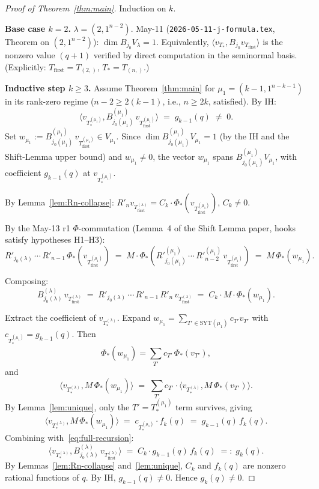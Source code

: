 \documentclass[11pt]{article}
\theoremstyle{definition}
\begin{document}
\begin{proof}[Proof of Theorem~\ref{thm:main}]
Induction on $k$.

\textbf{Base case $k = 2$.}  $\lambda = (2, 1^{n-2})$.  May-11
(\texttt{2026-05-11-j-formula.tex}, Theorem on $(2, 1^{n-2})$):
$\dim B_{j_0} V_\lambda = 1$.  Equivalently,
$\langle v_{T_{*}}, B_{j_0} v_{T_{\mathrm{first}}}\rangle$ is the
nonzero value $(q+1)$ verified by direct computation in the seminormal
basis.  (Explicitly: $T_{\mathrm{first}} = T_{(2,)}$, $T_{*} = T_{(n,)}$.)

\textbf{Inductive step $k \ge 3$.}  Assume Theorem~\ref{thm:main} for
$\mu_1 = (k{-}1, 1^{n-k-1})$ in its rank-zero regime ($n{-}2 \ge 2(k{-}1)$,
i.e., $n \ge 2k$, satisfied).  By IH:
\[
    \langle v_{T_{*}^{(\mu_1)}}, B^{(\mu_1)}_{j_0(\mu_1)}\,v_{T_{\mathrm{first}}^{(\mu_1)}}\rangle
    \;=\; g_{k-1}(q) \;\ne\; 0.
\]
Set $w_{\mu_1} := B^{(\mu_1)}_{j_0(\mu_1)}\,v_{T_{\mathrm{first}}^{(\mu_1)}}
\in V_{\mu_1}$.  Since $\dim B^{(\mu_1)}_{j_0(\mu_1)} V_{\mu_1} = 1$ (by
the IH and the Shift-Lemma upper bound) and $w_{\mu_1} \ne 0$, the
vector $w_{\mu_1}$ spans $B^{(\mu_1)}_{j_0(\mu_1)} V_{\mu_1}$, with
coefficient $g_{k-1}(q)$ at $v_{T_{*}^{(\mu_1)}}$.

By Lemma~\ref{lem:Rn-collapse}:
$R'_n v_{T_{\mathrm{first}}^{(\lambda)}} = C_k \cdot \Phi_*(v_{T_{\mathrm{first}}^{(\mu_1)}})$,
$C_k \ne 0$.

By the May-13 r1 $\Phi$-commutation (Lemma~4 of the Shift Lemma paper,
hooks satisfy hypotheses H1--H3):
\[
    R'_{j_0(\lambda)}\,\cdots\,R'_{n-1}\,\Phi_*(v_{T_{\mathrm{first}}^{(\mu_1)}})
    \;=\;
    M \cdot \Phi_*\!\left(R'^{(\mu_1)}_{j_0(\mu_1)}\,\cdots\,R'^{(\mu_1)}_{n-2}\,
    v_{T_{\mathrm{first}}^{(\mu_1)}}\right)
    \;=\; M\,\Phi_*(w_{\mu_1}).
\]

Composing:
\begin{equation}\label{eq:full-recursion}
    B^{(\lambda)}_{j_0(\lambda)}\,v_{T_{\mathrm{first}}^{(\lambda)}}
    \;=\;
    R'_{j_0(\lambda)}\,\cdots\,R'_{n-1}\,R'_n\,v_{T_{\mathrm{first}}^{(\lambda)}}
    \;=\;
    C_k \cdot M \cdot \Phi_*(w_{\mu_1}).
\end{equation}

Extract the coefficient of $v_{T_{*}^{(\lambda)}}$.  Expand
$w_{\mu_1} = \sum_{T' \in \mathrm{SYT}(\mu_1)} c_{T'} v_{T'}$ with
$c_{T_{*}^{(\mu_1)}} = g_{k-1}(q)$.  Then
\[
    \Phi_*(w_{\mu_1}) = \sum_{T'} c_{T'}\,\Phi_*(v_{T'}),
\]
and
\[
    \langle v_{T_{*}^{(\lambda)}}, M\,\Phi_*(w_{\mu_1})\rangle
    \;=\;
    \sum_{T'} c_{T'} \cdot \langle v_{T_{*}^{(\lambda)}}, M\,\Phi_*(v_{T'})\rangle.
\]
By Lemma~\ref{lem:unique}, only the $T' = T_{*}^{(\mu_1)}$ term survives,
giving
\[
    \langle v_{T_{*}^{(\lambda)}}, M\,\Phi_*(w_{\mu_1})\rangle
    \;=\; c_{T_{*}^{(\mu_1)}} \cdot f_k(q)
    \;=\; g_{k-1}(q)\,f_k(q).
\]
Combining with~\eqref{eq:full-recursion}:
\[
    \langle v_{T_{*}^{(\lambda)}}, B^{(\lambda)}_{j_0(\lambda)}\,v_{T_{\mathrm{first}}^{(\lambda)}}\rangle
    \;=\; C_k \cdot g_{k-1}(q)\,f_k(q) \;=:\; g_k(q).
\]
By Lemmas~\ref{lem:Rn-collapse} and~\ref{lem:unique}, $C_k$ and $f_k(q)$
are nonzero rational functions of $q$.  By IH, $g_{k-1}(q) \ne 0$.
Hence $g_k(q) \ne 0$.


\end{proof}
\end{document}
